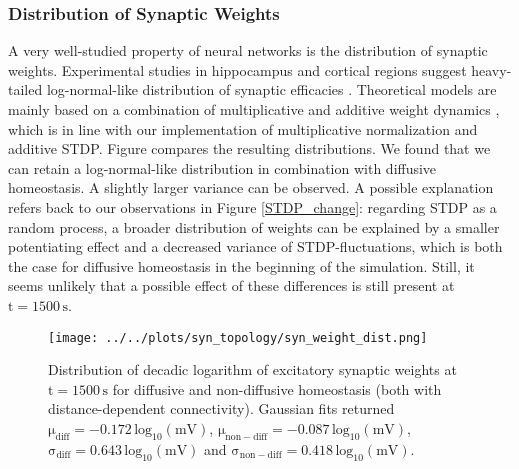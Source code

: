 \documentclass[10pt,a4paper]{article}
\begin{document}
\subsubsection{Distribution of Synaptic Weights}
A very well-studied property of neural networks is the distribution of synaptic weights. Experimental studies in hippocampus and cortical regions suggest heavy-tailed log-normal-like distribution of synaptic efficacies \cite{Song_Connectivity_2005,Lisman_Synapses_1993,Yasumatsu_Synapses_2008,Loewenstein_Spine_Sizes}. Theoretical models are mainly based on a combination of multiplicative and additive weight dynamics \cite{Loewenstein_Spine_Sizes,Statman_Synapses_2014}, which is in line with our implementation of multiplicative normalization and additive STDP. Figure compares the resulting distributions. We found that we can retain a log-normal-like distribution in combination with diffusive homeostasis. A slightly larger variance can be observed. A possible explanation refers back to our observations in Figure \ref{STDP_change}: regarding STDP as a random process, a broader distribution of weights can be explained by a smaller potentiating effect and a decreased variance of STDP-fluctuations, which is both the case for diffusive homeostasis in the beginning of the simulation. Still, it seems unlikely that a possible effect of these differences is still present at $\mathrm{t=1500\,s}$.
\begin{figure}
\texttt{[image: ../../plots/syn\_topology/syn\_weight\_dist.png]}
\caption{Distribution of decadic logarithm of excitatory synaptic weights at $\mathrm{t=1500\,s}$ for diffusive and non-diffusive homeostasis (both with distance-dependent connectivity). Gaussian fits returned $\mathrm{\mu_{diff}=-0.172\, log_{10}(mV)}$, $\mathrm{\mu_{non-diff}=-0.087\, log_{10}(mV)}$, $\mathrm{\sigma_{diff}=0.643\, log_{10}(mV)}$ and $\mathrm{\sigma_{non-diff}=0.418\, log_{10}(mV)}$.}
\label{Weight_Dist}
\end{figure}
\end{document}
